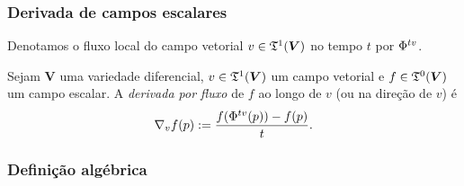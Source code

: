 \subsubsection{Derivada de campos escalares}

Denotamos o fluxo local do campo vetorial $v \in \mathfrak{T}^1(\bm V)$ no tempo $t$ por ${\Phi}^{{t}{v}}$.

\begin{definition}
Sejam $\bm V$ uma variedade diferencial, $v \in \mathfrak{T}^1(\bm V)$ um campo vetorial e $f \in \mathfrak{T}^0(\bm V)$ um campo escalar. A \emph{derivada por fluxo} de $f$ ao longo de $v$ (ou na direção de $v$) é
	\begin{equation*}
	\nabla_v f(p) := \frac{f({\Phi}^{{t}{v}}(p))-f(p)}{t}.
	\end{equation*}
\end{definition}





\subsubsection{Definição algébrica}

